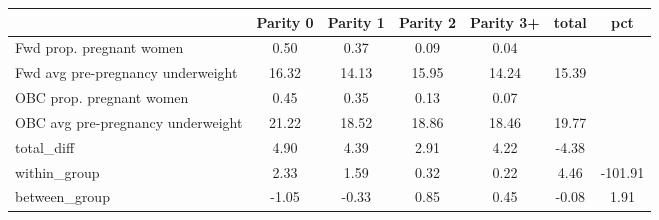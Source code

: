 \begin{tabular}{l*{6}{c}}
\toprule
            &\multicolumn{1}{c}{Parity 0}&\multicolumn{1}{c}{Parity 1}&\multicolumn{1}{c}{Parity 2}&\multicolumn{1}{c}{Parity 3+}&\multicolumn{1}{c}{total}&\multicolumn{1}{c}{pct}\\
\midrule
\midrule
Fwd prop. pregnant women&        0.50&        0.37&        0.09&        0.04&            &            \\
Fwd avg pre-pregnancy underweight&       16.32&       14.13&       15.95&       14.24&       15.39&            \\
OBC prop. pregnant women&        0.45&        0.35&        0.13&        0.07&            &            \\
OBC avg pre-pregnancy underweight&       21.22&       18.52&       18.86&       18.46&       19.77&            \\
total\_diff  &        4.90&        4.39&        2.91&        4.22&       -4.38&            \\
within\_group&        2.33&        1.59&        0.32&        0.22&        4.46&     -101.91\\
between\_group&       -1.05&       -0.33&        0.85&        0.45&       -0.08&        1.91\\
\bottomrule
\end{tabular}
